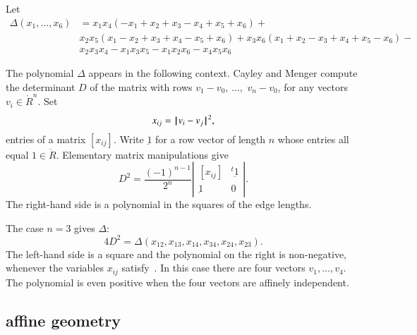 \begin{definition}[$\Delta$]\label{def:delta}  Let 
$$
\begin{array}{lll}
\Delta(x_1,\ldots,x_6) &= x_1 x_4 (- x_1+x_2+x_3- x_4+x_5+x_6)+\\&
            x_2 x_5 (x_1- x_2+x_3+x_4- x_5+x_6)
            +x_3 x_6 (x_1+x_2- x_3+x_4+x_5- x_6)
            - \\&x_2 x_3 x_4- x_1 x_3 x_5- x_1 x_2 x_6- x_4 x_5 x_6
\end{array}
$$
\end{definition}

The polynomial $\Delta$ appears in the following context.
Cayley and Menger compute the determinant $D$ of the
matrix with rows $v_1-v_0$, $\ldots,$ $v_n-v_0$, 
for any vectors $v_i\in\ring{R}^n$.   Set
\begin{equation}\label{eqn:xij}
x_{ij} = {\hskip0.1em|\hskip-0.15em|\hskip0.1em}v_i - v_j{\hskip0.1em|\hskip-0.15em|\hskip0.1em}^2,
\end{equation}
entries of a matrix $[x_{ij}]$.
Write $\underbar 1$ for a row vector of length $n$ 
whose entries all equal $1\in\ring{R}$.
Elementary matrix manipulations give
$$
D^2 = \frac{(-1)^{n-1}}{2^n}
    \left|\begin{matrix}[x_{ij}]& {}^t{\underbar 1}\\ {\underbar 1}& 0
        \end{matrix}\right|.
$$
The right-hand side is a polynomial in the squares of the edge lengths.

The case $n=3$ gives $\Delta$:
$$
4 D^2 = \Delta(x_{12},x_{13},x_{14},x_{34},x_{24},x_{23}).
$$
The
left-hand side is a square and the polynomial on the right is
non-negative, whenever the variables $x_{ij}$ satisfy~.  In this case there 
are four vectors $v_1,\ldots,v_4$.  
The polynomial is even positive when the four vectors are affinely independent.







\subsection{affine geometry}




